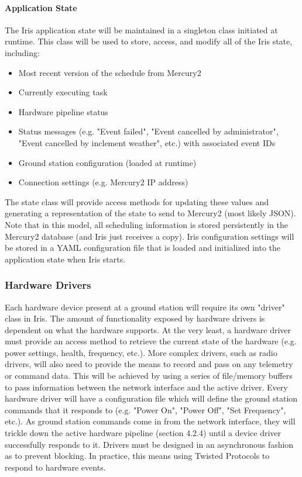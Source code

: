 \documentclass{mxl-note}
\begin{document}
\paragraph{Application State} The Iris application state will be maintained in a singleton class initiated at runtime. This class will be used to store, access, and modify all of the Iris state, including:
\begin{itemize}
	\item Most recent version of the schedule from Mercury2
	\item Currently executing task
	\item Hardware pipeline status
	\item Status messages (e.g. "Event failed", "Event cancelled by administrator", "Event cancelled by inclement weather", etc.) with associated event IDs
	\item Ground station configuration (loaded at runtime)
	\item Connection settings (e.g. Mercury2 IP address)
\end{itemize}
The state class will provide access methods for updating these values and generating a representation of the state to send to Mercury2 (most likely JSON). Note that in this model, all scheduling information is stored persistently in the Mercury2 database (and Iris just receives a copy). Iris configuration settings will be stored in a YAML configuration file that is loaded and initialized into the application state when Iris starts.

\subsubsection{Hardware Drivers}
Each hardware device present at a ground station will require its own "driver" class in Iris. The amount of functionality exposed by hardware drivers is dependent on what the hardware supports. At the very least, a hardware driver must provide an access method to retrieve the current state of the hardware (e.g. power settings, health, frequency, etc.). More complex drivers, such as radio drivers, will also need to provide the means to record and pass on any telemetry or command data. This will be achieved by using a series of file/memory buffers to pass information between the network interface and the active driver. Every hardware driver will have a configuration file which will define the ground station commands that it responds to (e.g. "Power On", "Power Off", "Set Frequency", etc.).  As ground station commands come in from the network interface, they will trickle down the active hardware pipeline (section 4.2.4) until a device driver successfully responds to it. Drivers must be designed in an asynchronous fashion as to prevent blocking. In practice, this means using Twisted Protocols to respond to hardware events. 
\end{document}

